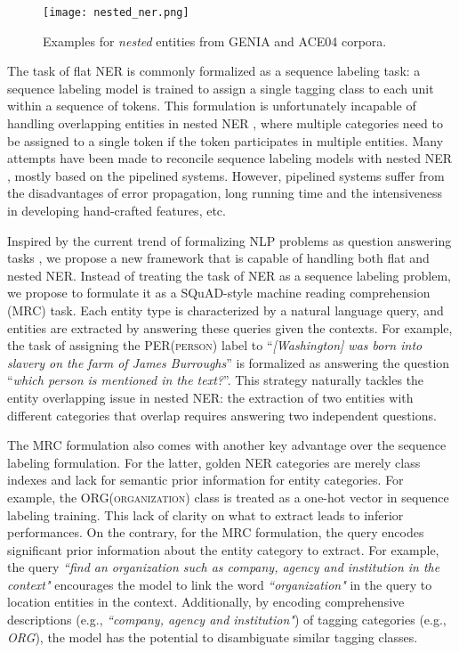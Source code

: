 \documentclass[11pt,a4paper]{article}
\begin{document}
\begin{figure}
\texttt{[image: nested\_ner.png]}
\centering
\caption{Examples for {\em nested} entities from GENIA and ACE04 corpora. } 
\label{illustration}
\end{figure}


The task of flat NER is commonly formalized as a sequence labeling task:
a 
sequence labeling model \cite{chiu2016named, ma2016end, devlin2018bert}
is trained to assign a single tagging class to each unit within a sequence of tokens. 
This formulation is unfortunately incapable of handling overlapping entities in nested NER \cite{huang2015bidirectional, chiu2015named}, where
multiple categories
 need to be assigned  to a single token if the token
 participates in multiple entities. 
Many attempts have been made to reconcile sequence labeling models with nested NER \cite{alex2007recognising,byrne2007nested,finkel2009nested,luroth2015,kati2018nested},  mostly based on the pipelined systems.
However, pipelined systems suffer from
the disadvantages of
error propagation, long running time and the
intensiveness 
in developing hand-crafted features, etc. 




 Inspired by the current trend of formalizing NLP problems  as  
question answering tasks \cite{levy2017zero,mccann2018natural, xiaoya2019relation},
we propose a new framework that is capable of handling both flat and nested NER. 
Instead of treating the task of NER as a sequence labeling problem, we propose to formulate it as a SQuAD-style \cite{rajpurkar2016squad, rajpurkar2018know} machine reading comprehension (MRC) task.
 Each entity type is characterized by a natural language query, and entities are extracted by answering these queries given the contexts. 
For example, the task of assigning the \textsc{PER(person)} label to ``{\em [Washington] was born into slavery on the farm of James Burroughs\/}'' 
 is formalized as answering the question ``{\it which person is mentioned in the text?}''. 
This strategy naturally  tackles the entity 
overlapping issue in nested NER: the extraction of two  entities with different categories that overlap requires answering two independent questions. 

The MRC formulation also comes with another key  advantage over the sequence labeling formulation. 
For the latter,
golden NER categories are merely class indexes and lack for semantic prior information 
for
 entity categories. 
For example, 
the 
 \textsc{ORG(organization)} class is treated as 
  a one-hot vector in sequence labeling training. 
This lack of clarity on what to extract leads to inferior performances. 
On the contrary, for the MRC formulation,
the  query
encodes significant prior information about the entity category to extract. 
For example, the query  {\em ``find an organization such as company, agency and institution in the context"}   encourages the model to link
the word
 {\em ``organization"} in the query 
   to location entities in the context. 
   Additionally, by encoding comprehensive descriptions (e.g., 
{\em ``company, agency and institution"}) of tagging categories  (e.g., {\em ORG}), 
the model has the potential to 
    disambiguate  similar tagging classes. 
\end{document}
